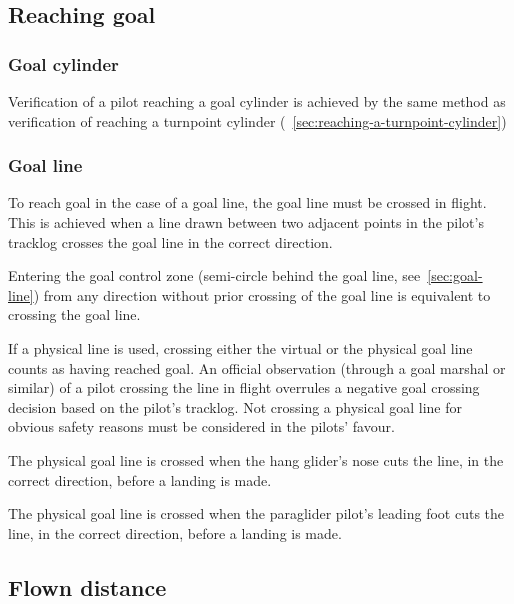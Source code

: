 \documentclass{article}
\begin{document}
\subsection{Reaching goal}
\subsubsection{Goal cylinder}
Verification of a pilot reaching a goal cylinder is achieved by the same method
as verification of reaching a turnpoint cylinder (~\ref{sec:reaching-a-turnpoint-cylinder})

\subsubsection{Goal line}
To reach goal in the case of a goal line, the goal line must be crossed in
flight. This is achieved when a line drawn between two adjacent points in the
pilot’s tracklog crosses the goal line in the correct direction.

\begin{pg}
Entering the goal control zone (semi-circle behind the goal line,
see~\ref{sec:goal-line}) from any direction without prior crossing of the goal
line is equivalent to crossing the goal line.
\end{pg}

If a physical line is used, crossing either the virtual or the physical goal
line counts as having reached goal. An official observation (through a goal
marshal or similar) of a pilot crossing the line in flight overrules a negative
goal crossing decision based on the pilot’s tracklog. Not crossing a physical
goal line for obvious safety reasons must be considered in the pilots’ favour.

\begin{hg}
The physical goal line is crossed when the hang glider’s nose cuts the line, in
the correct direction, before a landing is made.
\end{hg}

\begin{pg}
The physical goal line is crossed when the paraglider pilot’s leading foot cuts
the line, in the correct direction, before a landing is made.
\end{pg}

\subsection{Flown distance}
\end{document}
